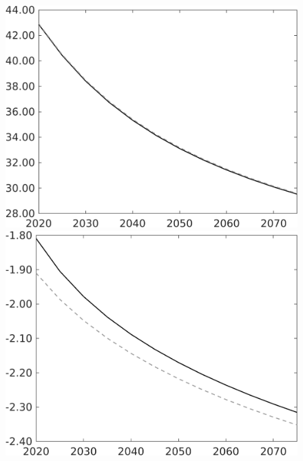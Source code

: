 \begin{figure}[h!!]
\begin{minipage}[]{0.32\textwidth}
\end{minipage}		
\begin{minipage}[]{0.32\textwidth}
\includegraphics[width=1\textwidth]{../../codding_model/own_basedOnFried/optimalPol_010922_revision/figures/all_13Sept22/PerdifNoTauf_regime0_CompTaul_sg_spillover0_nsk0_xgr0_sep1_LFlimit0_emsbase1_countec0_GovRev1_etaa0.79_lgd0.png}
\end{minipage}	
\begin{minipage}[]{0.32\textwidth}
\includegraphics[width=1\textwidth]{../../codding_model/own_basedOnFried/optimalPol_010922_revision/figures/all_13Sept22/PerdifNoTauf_regime0_CompTaul_sn_spillover0_nsk0_xgr0_sep1_LFlimit0_emsbase1_countec0_GovRev1_etaa0.79_lgd0.png}

\end{minipage}
\end{figure}
